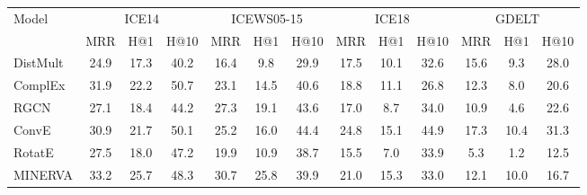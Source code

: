 \documentclass[11pt,a4paper]{article}
\begin{document}
\begin{table*}[htb]
\small
\centering
\begin{tabular}{lcccccccccccc}
    
\toprule
\multirow{2}{*}{Model} &\multicolumn{3}{c}{ICE14} &\multicolumn{3}{c}{ICEWS05-15} &\multicolumn{3}{c}{ICE18} &\multicolumn{3}{c}{GDELT}\\
\cmidrule(r){2-4}  \cmidrule(r){5-7} \cmidrule(r){8-10} \cmidrule(r){11-13}  &MRR &H@1 &H@10
&MRR &H@1 &H@10 &MRR &H@1 &H@10 &MRR &H@1 &H@10\\
\midrule
\scriptsize{DistMult}\!\!\!  &24.9   &17.3  &40.2  &16.4 &9.8  &29.9  & 17.5  & 10.1 &32.6 &15.6 &9.3   &28.0        \\
\scriptsize{ComplEx}\!\!\!   &31.9   &22.2  &50.7  &23.1 &14.5 &40.6  & 18.8  & 11.1 &26.8 &12.3 &8.0   &20.6    \\
\scriptsize{RGCN}\!\!\!     &27.1   &18.4  &44.2  &27.3 &19.1 &43.6  & 17.0  & 8.7  &34.0 &10.9 &4.6   &22.6        \\
\scriptsize{ConvE}\!\!\!     &30.9   &21.7  &50.1  &25.2 &16.0 &44.4  & 24.8  &15.1 &44.9 &17.3 &10.4  &31.3   \\
\scriptsize{RotatE}\!\!\!    &27.5   &18.0  &47.2  &19.9 &10.9 &38.7  & 15.5  & 7.0  &33.9 &5.3 &1.2  &12.5   \\
\scriptsize{MINERVA}\!\!\!    &33.2   &25.7  &48.3  &30.7 &25.8 &39.9  & 21.0  & 15.3  &33.0 &12.1 &10.0  &16.7   \\


\end{tabular}
\end{table*}
\end{document}
